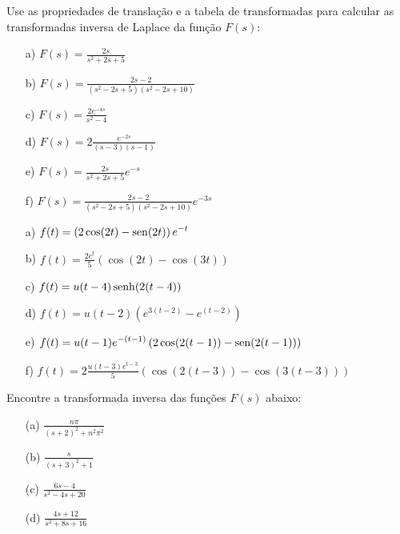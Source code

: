 \documentclass[Main.tex]{subfiles}
\begin{document}
 \begin{Exercise}Use as propriedades de translação e a tabela de transformadas para calcular as transformadas inversa de Laplace da função $F(s)$:
 \begin{itemize}
  \item[a)] $\displaystyle F(s)=\frac{2s}{s^2+2s+5}$
    \item[b)] $\displaystyle F(s)=\frac{2s-2}{(s^2-2s+5)(s^2-2s+10)}$
  \item[c)] $\displaystyle F(s)=\frac{2e^{-4s}}{s^2-4}$
    \item[d)] $\displaystyle F(s)=2\frac{e^{-2s}}{(s-3)(s-1)}$
    
    \item[e)] $\displaystyle F(s)=\frac{2s}{s^2+2s+5}e^{-s}$
    \item[f)] $\displaystyle F(s)=\frac{2s-2}{(s^2-2s+5)(s^2-2s+10)}e^{-3s}$

 \end{itemize}
\end{Exercise}
\begin{Answer}
\begin{itemize}
  \item[a)] $\displaystyle f(t)=\left(2\cos(2t)-\operatorname{sen}(2t)\right)e^{-t}$ 
      \item[b)] $\displaystyle f(t)=\frac{2e^{t}}{5}\left(\cos(2t)-\cos(3t)\right)$ 
        \item[c)] $\displaystyle f(t)=u(t-4)\operatorname{senh}(2(t-4))$ 
      \item[d)] $\displaystyle f(t)=u(t-2)\left(e^{3(t-2)}-e^{(t-2)}\right)$ 

        \item[e)] $\displaystyle f(t)=u(t-1)e^{-(t-1)}\left(2\cos(2(t-1))-\operatorname{sen}(2(t-1))\right)$ 
      \item[f)] $\displaystyle f(t)=2\frac{u(t-3)e^{t-3}}{5}\left(\cos(2(t-3))-\cos(3(t-3))\right)$ 

 \end{itemize}

\end{Answer}
 
 \begin{Exercise}
Encontre a transformada inversa das funções $F(s)$ abaixo:
\begin{itemize}
  \item[(a)] $\displaystyle \frac{n\pi}{(s+2)^2 + n^2\pi^2}$
  \item[(b)] $\displaystyle \frac{s}{(s+3)^2+1}$
  \item[(c)] $\displaystyle \frac{6s-4}{s^2 - 4s +20}$
  \item[(d)] $\displaystyle \frac{4s + 12}{s^2 + 8s + 16}$
\end{itemize}
\end{Exercise}
\end{document}
